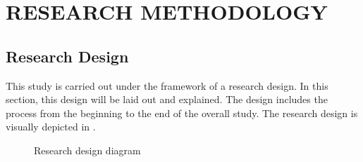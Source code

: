 \chapter{RESEARCH METHODOLOGY}\label{ch:research_methodology}


\section{Research Design}
\noindent This study is carried out under the framework of a research design. In this section, this design will be laid out and explained. The design includes the process from the beginning to the end of the overall study. The research design is visually depicted in .

\begin{figure}[H]
      \centering
      \caption{Research design diagram}\label{fig:research_design_diagram}
\end{figure}

